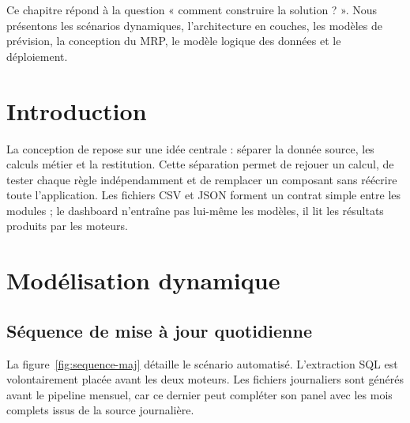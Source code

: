 
\begin{objectifbox}
Ce chapitre répond à la question « comment construire la solution ? ». Nous
présentons les scénarios dynamiques, l'architecture en couches, les modèles de
prévision, la conception du MRP, le modèle logique des données et le déploiement.
\end{objectifbox}

\section{Introduction}

La conception de \NomProjet repose sur une idée centrale : séparer la donnée
source, les calculs métier et la restitution. Cette séparation permet de rejouer
un calcul, de tester chaque règle indépendamment et de remplacer un composant sans
réécrire toute l'application. Les fichiers CSV et JSON forment un contrat simple
entre les modules ; le dashboard n'entraîne pas lui-même les modèles, il lit les
résultats produits par les moteurs.

\section{Modélisation dynamique}

\subsection{Séquence de mise à jour quotidienne}

La figure~\ref{fig:sequence-maj} détaille le scénario automatisé. L'extraction SQL
est volontairement placée avant les deux moteurs. Les fichiers journaliers sont
générés avant le pipeline mensuel, car ce dernier peut compléter son panel avec les
mois complets issus de la source journalière.

